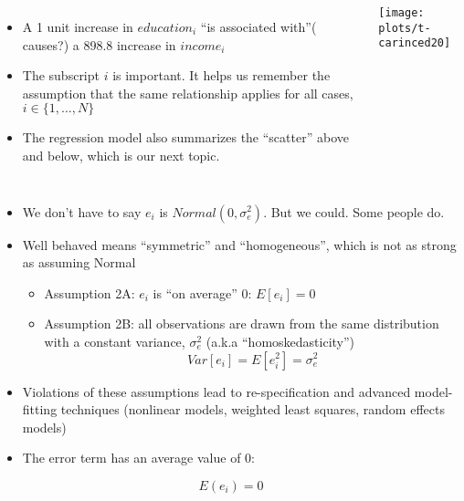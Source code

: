 \documentclass[10pt,english]{beamer}
\def\lyxframeend{} %
\begin{document}
\lyxframeend{}
\begin{columns}%


\column{6cm}
\begin{itemize}
\item A 1 unit increase in $education_{i}$ ``is associated with''( causes?)
a 898.8 increase in $income_{i}$
\item The subscript $i$ is important. It helps us remember the assumption
that the same relationship applies for all cases, $i\in\{1,\ldots,N\}$
\item The regression model also summarizes the ``scatter'' above and below,
which is our next topic.
\end{itemize}

\column{6cm}


\texttt{[image: plots/t-carinced20]}

\end{columns}%

\lyxframeend{}
\begin{itemize}
\item We don't have to say $e_{i}$ is $Normal(0,\sigma_{e}^{2})$. But
we could. Some people do.
\item Well behaved means ``symmetric'' and ``homogeneous'', which is
not as strong as assuming Normal

\begin{itemize}
\item Assumption 2A: $e_{i}$ is ``on average'' 0: $E[e_{i}]=0$
\item Assumption 2B: all observations are drawn from the same distribution
with a constant variance, $\sigma_{e}^{2}$ (a.k.a ``homoskedasticity'')
\[
Var[e_{i}]=E[e_{i}^{2}]=\sigma_{e}^{2}
\]

\end{itemize}
\item Violations of these assumptions lead to re-specification and advanced
model-fitting techniques (nonlinear models, weighted least squares,
random effects models)
\end{itemize}

\lyxframeend{}
\begin{itemize}
\item The error term has an average value of $0$:
\end{itemize}
\begin{equation}
E(e_{i})=0
\end{equation}
\end{document}
